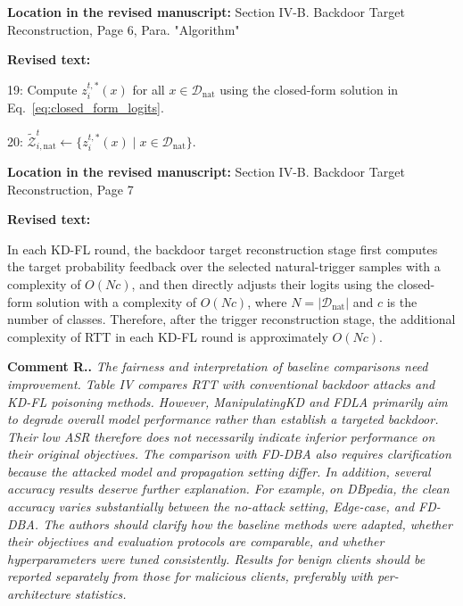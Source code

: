 \documentclass[11pt,a4paper]{article}
\newcounter{reviewernum}
\newcounter{commentnum}
\newcommand{\reviewcomment}[1]{%
  \stepcounter{commentnum}%
  \begin{tcolorbox}[
      enhanced,breakable,colback=black!3,colframe=black!20,
      boxrule=0.5pt,arc=1.2mm,left=9pt,right=9pt,top=8pt,bottom=8pt]
    {\bfseries Comment R\arabic{reviewernum}.\arabic{commentnum}.}\quad
    {\itshape #1}
  \end{tcolorbox}%
}
\newcommand{\revisedtext}[2]{%
  {\bfseries\color{headingnavy}Location in the revised manuscript:} #1\par
  \begin{tcolorbox}[
      enhanced,breakable,colback=replyblue!3,colframe=replyblue!18,
      before upper={\setlength{\parskip}{6pt}},
      borderline west={2.5pt}{0pt}{replyblue},
      boxrule=0.5pt,arc=1mm,left=11pt,right=9pt,top=8pt,bottom=8pt]
    {\bfseries\color{headingnavy}Revised text:}\par
    #2
  \end{tcolorbox}
  \vspace{0.35em}%
}
\begin{document}
\revisedtext{Section IV-B. Backdoor Target Reconstruction, Page 6, Para. "Algorithm"}
{19: Compute $z_i^{t,*}(x)$ for all $x\in\mathcal{D}_{\mathrm{nat}}$ using the closed-form solution in Eq.~\ref{eq:closed_form_logits}.

20: $\widetilde{\mathcal{Z}}_{i,\mathrm{nat}}^t \leftarrow\{z_i^{t,*}(x)\mid x\in\mathcal{D}_{\mathrm{nat}}\}$.}

\revisedtext{Section IV-B. Backdoor Target Reconstruction, Page 7}
{In each KD-FL round, the backdoor target reconstruction stage first computes the target probability feedback over the selected natural-trigger samples with a complexity of $O(Nc)$, and then directly adjusts their logits using the closed-form solution with a complexity of $O(Nc)$, where $N=|\mathcal{D}_\mathrm{nat}|$ and $c$ is the number of classes.
Therefore, after the trigger reconstruction stage, the additional complexity of RTT in each KD-FL round is approximately $O(Nc)$.}

\reviewcomment{The fairness and interpretation of baseline comparisons need improvement.
Table IV compares RTT with conventional backdoor attacks and KD-FL poisoning methods. However, ManipulatingKD and FDLA primarily aim to degrade overall model performance rather than establish a targeted backdoor. Their low ASR therefore does not necessarily indicate inferior performance on their original objectives. The comparison with FD-DBA also requires clarification because the attacked model and propagation setting differ. In addition, several accuracy results deserve further explanation. For example, on DBpedia, the clean accuracy varies substantially between the no-attack setting, Edge-case, and FD-DBA. The authors should clarify how the baseline methods were adapted, whether their objectives and evaluation protocols are comparable, and whether hyperparameters were tuned consistently. Results for benign clients should be reported separately from those for malicious clients, preferably with per-architecture statistics.}
\end{document}
